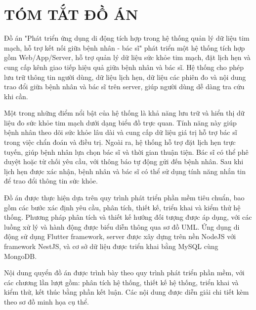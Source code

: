 \section*{TÓM TẮT ĐỒ ÁN}

Đồ án "Phát triển ứng dụng di động tích hợp trong hệ thống quản lý dữ liệu tim
mạch, hỗ trợ kết nối giữa bệnh nhân - bác sĩ" phát triển một hệ thống tích hợp gồm Web/App/Server, hỗ trợ quản lý dữ liệu sức khỏe tim mạch, đặt lịch hẹn và cung cấp kênh giao tiếp hiệu quả giữa bệnh nhân và bác sĩ.
Hệ thống cho phép lưu trữ thông tin người dùng, dữ liệu lịch hẹn, dữ liệu các phiên đo và nội dung trao đổi giữa bệnh nhân và bác sĩ trên server, giúp người dùng dễ dàng tra cứu khi cần.

Một trong những điểm nổi bật của hệ thống là khả năng lưu trữ và hiển thị dữ liệu đo sức khỏe tim mạch dưới dạng biểu đồ trực quan. Tính năng này giúp bệnh nhân theo dõi sức khỏe lâu dài và cung cấp dữ liệu giá trị hỗ trợ bác sĩ trong việc chẩn đoán và điều trị.
Ngoài ra, hệ thống hỗ trợ đặt lịch hẹn trực tuyến, giúp bệnh nhân lựa chọn bác sĩ và thời gian thuận tiện. Bác sĩ có thể phê duyệt hoặc từ chối yêu cầu, với thông báo tự động gửi đến bệnh nhân. Sau khi lịch hẹn được xác nhận, bệnh nhân và bác sĩ có thể sử dụng tính năng nhắn tin để trao đổi thông tin sức khỏe.

Đồ án được thực hiện dựa trên quy trình phát triển phần mềm tiêu chuẩn, bao gồm các bước xác định yêu cầu, phân tích, thiết kế, triển khai và kiểm thử hệ thống. Phương pháp phân tích và thiết kế hướng đối tượng được áp dụng, với các luồng xử lý và hành động được biểu diễn thông qua sơ đồ UML.
Ứng dụng di động sử dụng Flutter framework, server được xây dựng trên nền NodeJS với framework NestJS, và cơ sở dữ liệu được triển khai bằng MySQL cùng MongoDB.

Nội dung quyển đồ án được trình bày theo quy trình phát triển phần mềm, với các chương lần lượt gồm: phân tích hệ thống, thiết kế hệ thống, triển khai và kiểm thử, kết thúc bằng phần kết luận. Các nội dung được diễn giải chi tiết kèm theo sơ đồ minh họa cụ thể.


